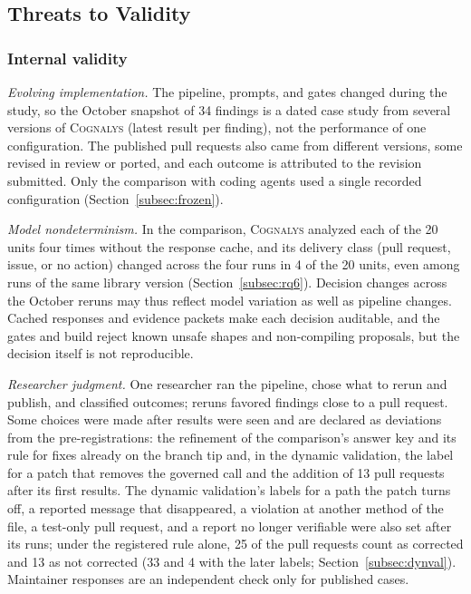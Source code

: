 \documentclass[conference]{IEEEtran}
\newcommand{\system}{\textsc{Cognalys}}
\begin{document}
\subsection{Threats to Validity}
\label{subsec:threats}

\subsubsection{Internal validity}

\emph{Evolving implementation.} The pipeline, prompts, and gates changed during
the study, so the October snapshot of 34 findings is a dated case study from
several versions of \system{} (latest result per finding), not the performance
of one configuration. The published pull requests also came from different
versions, some revised in review or ported, and each outcome is attributed to
the revision submitted. Only the comparison with coding
agents used a single recorded configuration (Section~\ref{subsec:frozen}).

\emph{Model nondeterminism.} In the comparison, \system{} analyzed each of
the 20 units four times without the response cache, and its delivery class
(pull request, issue, or no action) changed across the four runs in 4 of the
20 units, even among runs of the same library version (Section~\ref{subsec:rq6}).
Decision changes across the October reruns may thus reflect model variation
as well as pipeline changes. Cached responses and evidence packets make each
decision auditable, and the gates and build reject known unsafe shapes and
non-compiling proposals, but the decision itself is not reproducible.

\emph{Researcher judgment.} One researcher ran the pipeline, chose what to
rerun and publish, and classified outcomes; reruns favored findings close to a
pull request. Some choices were made after results were seen and are declared
as deviations from the pre-registrations: the refinement of the comparison's
answer key and its rule for fixes already on the branch tip and, in the dynamic
validation, the label for a patch that removes the governed call and the
addition of 13 pull requests after its first results. The dynamic validation's
labels for a path the patch turns off, a reported message that disappeared, a
violation at another method of the file, a test-only pull request, and a report
no longer verifiable were also set after its runs; under the registered rule
alone, 25 of the pull requests count as corrected and 13 as not corrected (33 and 4 with the
later labels; Section~\ref{subsec:dynval}). Maintainer responses are an
independent check only for published cases.
\end{document}
